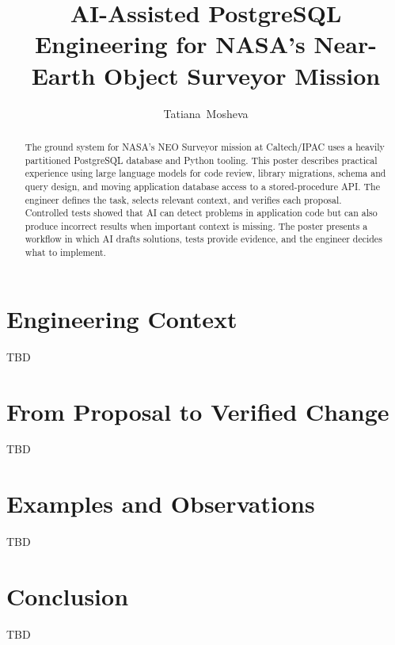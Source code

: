 \documentclass[11pt,twoside]{article}
\begin{document}
\title{AI-Assisted PostgreSQL Engineering for NASA's Near-Earth Object Surveyor Mission}
\author{Tatiana~Mosheva}


\begin{abstract}
The ground system for NASA's NEO Surveyor mission at Caltech/IPAC uses a heavily partitioned PostgreSQL database and Python tooling. This poster describes practical experience using large language models for code review, library migrations, schema and query design, and moving application database access to a stored-procedure API. The engineer defines the task, selects relevant context, and verifies each proposal. Controlled tests showed that AI can detect problems in application code but can also produce incorrect results when important context is missing. The poster presents a workflow in which AI drafts solutions, tests provide evidence, and the engineer decides what to implement.
\end{abstract}


\section{Engineering Context}
TBD

\section{From Proposal to Verified Change}
TBD

\section{Examples and Observations}
TBD

\section{Conclusion}
TBD
\end{document}

